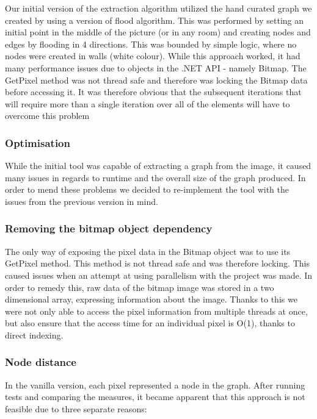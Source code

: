 \documentclass[main.tex]{subfiles}
\begin{document}
Our initial version of the extraction algorithm utilized the hand curated graph we created by using a version of flood algorithm. This was performed by setting an initial point in the middle of the picture (or in any room)  and creating nodes and edges by flooding in 4 directions. This was bounded by simple logic, where no nodes were created in walls (white colour). While this approach worked, it had many performance issues due to objects in the .NET API - namely Bitmap. The GetPixel method was not thread safe and therefore was locking the Bitmap data before accessing it. It was therefore obvious that the subsequent iterations that will require more than a single iteration over all of the elements will have to overcome this problem

\subsubsection{Optimisation}
While the initial tool was capable of extracting a graph from the image, it caused many issues in regards to runtime and the overall size of the graph produced. In order to mend these problems we decided to re-implement the tool with the issues from the previous version in mind. 

\subsubsection{Removing the bitmap object dependency}

The only way of exposing the pixel data in the Bitmap object was to use its GetPixel method. This method is not thread safe and was therefore locking. This caused issues when an attempt at using parallelism with the project was made. In order to remedy this, raw data of the bitmap image was stored in a two dimensional array, expressing information about the image. Thanks to this we were not only able to access the pixel information from multiple threads at once, but also ensure that the access time for an individual pixel is O(1), thanks to direct indexing. 

\subsubsection{Node distance}
In the vanilla version, each pixel represented a node in the graph. After running tests and comparing the measures, it became apparent that this approach is not feasible due to three separate reasons:
	
\end{document}
